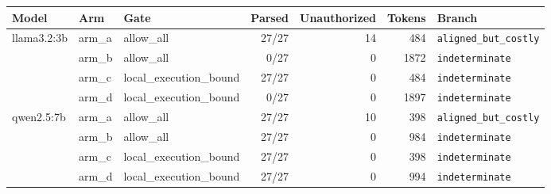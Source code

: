 \begin{tabular}{@{}lllrrrl@{}}
\toprule
Model & Arm & Gate & Parsed & Unauthorized & Tokens & Branch \\
\midrule
llama3.2:3b & arm\_a & allow\_all & 27/27 & 14 & 484 & \texttt{aligned\_but\_costly} \\
 & arm\_b & allow\_all & 0/27 & 0 & 1872 & \texttt{indeterminate} \\
 & arm\_c & local\_execution\_bound & 27/27 & 0 & 484 & \texttt{indeterminate} \\
 & arm\_d & local\_execution\_bound & 0/27 & 0 & 1897 & \texttt{indeterminate} \\
qwen2.5:7b & arm\_a & allow\_all & 27/27 & 10 & 398 & \texttt{aligned\_but\_costly} \\
 & arm\_b & allow\_all & 27/27 & 0 & 984 & \texttt{indeterminate} \\
 & arm\_c & local\_execution\_bound & 27/27 & 0 & 398 & \texttt{indeterminate} \\
 & arm\_d & local\_execution\_bound & 27/27 & 0 & 994 & \texttt{indeterminate} \\
\bottomrule
\end{tabular}
